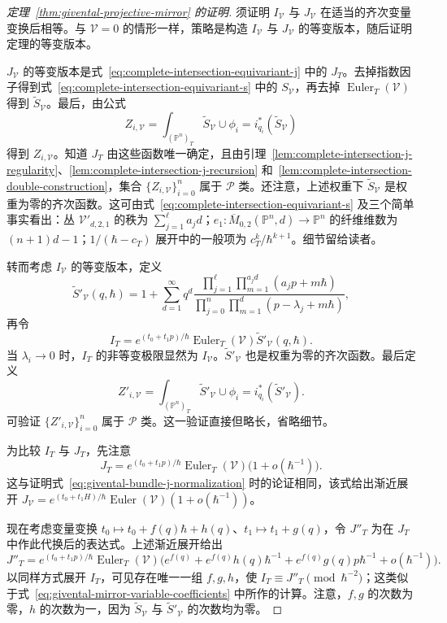 \begin{proof}[定理~\ref{thm:givental-projective-mirror} 的证明]
须证明 $I_{\mathcal V}$ 与 $J_{\mathcal V}$ 在适当的齐次变量变换后相等。与 $\mathcal V=0$ 的情形一样，策略是构造 $I_{\mathcal V}$ 与 $J_{\mathcal V}$ 的等变版本，随后证明定理的等变版本。

$J_{\mathcal V}$ 的等变版本是式~\eqref{eq:complete-intersection-equivariant-j} 中的 $J_T$。去掉指数因子得到式~\eqref{eq:complete-intersection-equivariant-s} 中的 $S_{\mathcal V}$，再去掉 $\operatorname{Euler}_T(\mathcal V)$ 得到 $\widetilde S_{\mathcal V}$。最后，由公式
\[
Z_{i,\mathcal V}=\int_{(\mathbb P^n)_T}\widetilde S_{\mathcal V}\cup\phi_i=i_{q_i}^*(\widetilde S_{\mathcal V})
\]
得到 $Z_{i,\mathcal V}$。知道 $J_T$ 由这些函数唯一确定，且由引理~\ref{lem:complete-intersection-j-regularity}、\ref{lem:complete-intersection-j-recursion} 和~\ref{lem:complete-intersection-double-construction}，集合 $\{Z_{i,\mathcal V}\}_{i=0}^n$ 属于 $\mathcal P$ 类。还注意，上述权重下 $\widetilde S_{\mathcal V}$ 是权重为零的齐次函数。这可由式~\eqref{eq:complete-intersection-equivariant-s} 及三个简单事实看出：丛 $\mathcal V'_{d,2,1}$ 的秩为 $\sum_{j=1}^{\ell}a_jd$；$e_1:\overline M_{0,2}(\mathbb P^n,d)\to\mathbb P^n$ 的纤维维数为 $(n+1)d-1$；$1/(\hbar-c_T)$ 展开中的一般项为 $c_T^k/\hbar^{k+1}$。细节留给读者。

转而考虑 $I_{\mathcal V}$ 的等变版本，定义
\begin{equation}\label{eq:complete-intersection-equivariant-i-series}
\widetilde S'_{\mathcal V}(q,\hbar)=1+\sum_{d=1}^{\infty}q^d
\frac{\prod_{j=1}^{\ell}\prod_{m=1}^{a_jd}(a_jp+m\hbar)}{\prod_{j=0}^n\prod_{m=1}^d(p-\lambda_j+m\hbar)},
\end{equation}
再令
\[
I_T=e^{(t_0+t_1p)/\hbar}\operatorname{Euler}_T(\mathcal V)\widetilde S'_{\mathcal V}(q,\hbar).
\]
当 $\lambda_i\to0$ 时，$I_T$ 的非等变极限显然为 $I_{\mathcal V}$。$\widetilde S'_{\mathcal V}$ 也是权重为零的齐次函数。最后定义
\[
Z'_{i,\mathcal V}=\int_{(\mathbb P^n)_T}\widetilde S'_{\mathcal V}\cup\phi_i=i_{q_i}^*(\widetilde S'_{\mathcal V}).
\]
可验证 $\{Z'_{i,\mathcal V}\}_{i=0}^n$ 属于 $\mathcal P$ 类。这一验证直接但略长，省略细节。

为比较 $I_T$ 与 $J_T$，先注意
\[
J_T=e^{(t_0+t_1p)/\hbar}\operatorname{Euler}_T(\mathcal V)\bigl(1+o(\hbar^{-1})\bigr).
\]
这与证明式~\eqref{eq:givental-bundle-j-normalization} 时的论证相同，该式给出渐近展开 $J_{\mathcal V}=e^{(t_0+t_1H)/\hbar}\operatorname{Euler}(\mathcal V)(1+o(\hbar^{-1}))$。

现在考虑变量变换 $t_0\mapsto t_0+f(q)\hbar+h(q)$、$t_1\mapsto t_1+g(q)$，令 $J''_T$ 为在 $J_T$ 中作此代换后的表达式。上述渐近展开给出
\[
J''_T=e^{(t_0+t_1p)/\hbar}\operatorname{Euler}_T(\mathcal V)
\bigl(e^{f(q)}+e^{f(q)}h(q)\hbar^{-1}+e^{f(q)}g(q)p\hbar^{-1}+o(\hbar^{-1})\bigr).
\]
以同样方式展开 $I_T$，可见存在唯一一组 $f,g,h$，使 $I_T\equiv J''_T\pmod{\hbar^{-2}}$；这类似于式~\eqref{eq:givental-mirror-variable-coefficients} 中所作的计算。注意，$f,g$ 的次数为零，$h$ 的次数为一，因为 $\widetilde S_{\mathcal V}$ 与 $\widetilde S'_{\mathcal V}$ 的次数均为零。


\end{proof}
